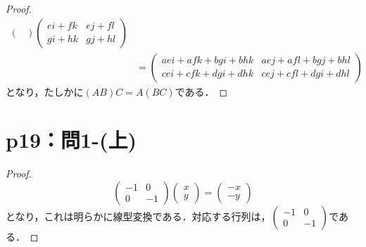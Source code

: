 \documentclass[a4paper,10pt,fleqn]{ltjsarticle}
\begin{document}
\begin{tleftbar}
\begin{proof}
\begin{align*}
\begin{pmatrix}
            \end{pmatrix}
            \begin{pmatrix}
                ei + fk & ej +fl \\
                gi + hk & gj +hl
            \end{pmatrix}
            \\
                  & =
            \begin{pmatrix}
                aei + afk +bgi +bhk  & aej +afl +bgj +bhl   \\
                cei + cfk + dgi +dhk & cej + cfl + dgi +dhl
            \end{pmatrix}
        \end{align*}
        となり，たしかに$(AB)C=A(BC)$である．
    \end{proof}
\end{tleftbar}
%
\newpage
\section*{p19：問1-(上)}
%
%
\begin{tleftbar}
    \begin{proof}
        \[
            \begin{pmatrix}
                -1 & 0  \\
                0  & -1
            \end{pmatrix}
            \begin{pmatrix}
                x \\
                y
            \end{pmatrix}
            =
            \begin{pmatrix}
                -x \\
                -y
            \end{pmatrix}
        \]
        となり，これは明らかに線型変換である．対応する行列は，$
            \begin{pmatrix}
                -1 & 0  \\
                0  & -1
            \end{pmatrix}
        $である．
    \end{proof}
\end{tleftbar}
\end{document}
